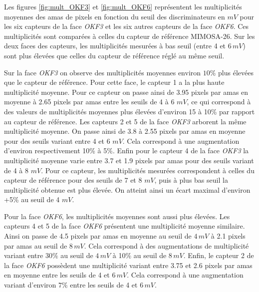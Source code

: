   
   Les figures \ref{fig:mult_OKF3} et \ref{fig:mult_OKF6} repr\'esentent les multiplicit\'es moyennes des amas de pixels en fonction du seuil des discriminateurs en $mV$ pour les six capteurs de la face \textit{OKF3} et les six autres capteurs de la face \textit{OKF6}. Ces multiplicit\'es sont compar\'ees \`a celles du capteur de r\'ef\'erence MIMOSA-26. Sur les deux faces des capteurs, les multiplicit\'es mesur\'ees \`a bas seuil (entre 4 et $6 \, mV$) sont plus \'elev\'ees que celles du capteur de r\'ef\'erence r\'egl\'e au m\^eme seuil. 
   
   \medskip
   
   Sur la face \textit{OKF3} on observe des multiplicit\'es moyennes environ $10 \%$ plus \'elev\'ees que le capteur de r\'ef\'erence. Pour cette face, le capteur 1 a la plus haute multiplicit\'e moyenne. Pour ce capteur on passe ainsi de 3.95 pixels par amas en moyenne \`a 2.65 pixels par amas entre les seuils de 4 \`a 6 $mV$, ce qui correspond \`a des valeurs de multiplicit\'es moyennes plus \'elev\'ees d'environ 15 \`a 10\% par rapport au capteur de r\'ef\'erence. Les capteurs 2 et 5 de la face \textit{OKF3} arborent la m\^eme multiplicit\'e moyenne. On passe ainsi de 3.8 \`a 2.55 pixels par amas en moyenne pour des seuils variant entre 4 et 6 $mV$. Cela correspond \`a une augmentation d'environ respectivement 10\% \`a 5\%. Enfin pour le capteur 4 de la face \textit{OKF3} la multiplicit\'e moyenne varie entre 3.7 et 1.9 pixels par amas pour des seuils variant de 4 \`a 8 $mV$. Pour ce capteur, les multiplicit\'es mesur\'ees correspondent \`a celles du capteur de r\'ef\'erence pour des seuils de 7 et 8 $mV$, puis \`a plus bas seuil la multiplicit\'e obtenue est plus \'elev\'ee. On atteint ainsi un \'ecart maximal d'environ +5\% au seuil de 4 $mV$. 
   
   \medskip
   
   Pour la face \textit{OKF6}, les multiplicit\'es moyennes sont aussi plus \'elev\'ees. Les capteurs 4 et 5 de la face \textit{OKF6} pr\'esentent une multiplicit\'e moyenne similaire. Ainsi on passe de 4.5 pixels par amas en moyenne au seuil de $4 \, mV$ \`a 2.1 pixels par amas au seuil de $8 \, mV$. Cela correspond \`a des augmentations de multiplicit\'e variant entre $30\%$ au seuil de $4 \, mV$ \`a 10\% au seuil de $8 \, mV$. Enfin, le capteur 2 de la face \textit{OKF6} poss\`edent une multiplicit\'e variant entre 3.75 et 2.6 pixels par amas en moyenne entre les seuils de 4 et $6 \, mV$. Cela correspond \`a une augmentation variant d'environ $7\%$ entre les seuils de 4 et $6 \, mV$.  
   
